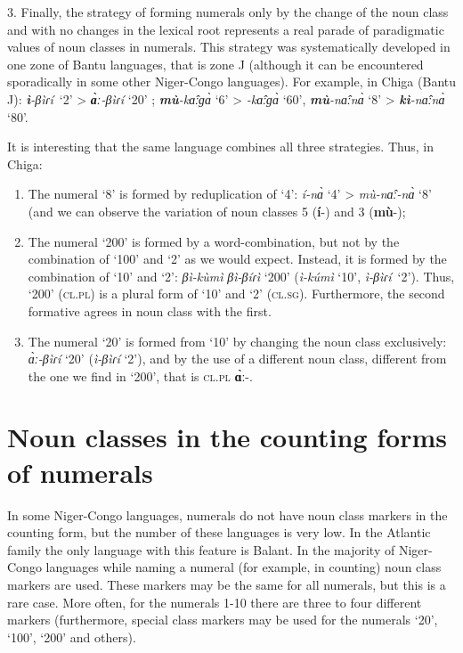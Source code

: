 3. Finally, the strategy of forming numerals only by the change of the noun class and with no changes in the lexical root represents a real parade of paradigmatic values of noun classes in numerals. This strategy was systematically developed in one zone of Bantu languages, that is zone J (although it can be encountered sporadically in some other Niger-Congo languages). For example, in Chiga (Bantu J): \textbf{\textit{ì}}\textit{-}\textit{βìɾ{\'{i}}}~‘2’ > \textbf{\textit{{\`{ɑ}}ː}}\textit{-}\textit{βìɾ{\'{i}}} ‘20’ ;  \textbf{\textit{m{\`{u}}}}\textit{-k{\^{ɑ}}ːɡ{\`{ɑ}}} ‘6’ >  \textbf{\textit{{}}}\textit{-k{\^{ɑ}}ːɡ{\`{ɑ}}} ‘60’, \textbf{\textit{m{\`{u}}}}\textit{-n{\^{ɑ}}ːn{\`{ɑ}}} ‘8’ > \textbf{\textit{kì}}\textit{-n{\^{ɑ}}ːn{\`{ɑ}}} ‘80’. 

It is interesting that the same language combines all three strategies. Thus, in Chiga: 

\begin{enumerate}
\item The numeral ‘8’ is formed by reduplication of ‘4’: \textit{{\'{i}}-n{\`{ɑ}}} ‘4’ > \textit{m{\`{u}}-n{\^{ɑ}}ː-n{\`{ɑ}}} ‘8’ (and we can observe the variation of noun classes 5 (\textbf{{\'{i}}}-) and 3 (\textbf{m{\`{u}}}-);
\item The numeral ‘200’ is formed by a word-combination, but not by the combination of ‘100’ and ‘2’ as we would expect. Instead, it is formed by the combination of ‘10’ and ‘2’: \textit{βì-k{\`{u}}mì} \textit{βì-}\textit{β{\'{i}}ɾì} ‘200’ (\textit{ì-k{\'{u}}mì} ‘10’, \textit{ì-β}\textit{ìɾ{\'{i}}}~‘2’). Thus, ‘200’ (\textsc{cl}.\textsc{pl}) is a plural form of ‘10’ and ‘2’ (\textsc{cl}.\textsc{sg}). Furthermore, the second formative agrees in noun class with the first. 
\item The numeral ‘20’ is formed from ‘10’ by changing the noun class exclusively: \textit{{\`{ɑ}}ː-β}\textit{ìɾ{\'{i}}} ‘20’ (\textit{ì-β}\textit{ìɾ{\'{i}}} ‘2’), and by the use of a different noun class, different from the one we find in ‘200’, that is \textsc{cl}.\textsc{pl} \textbf{{\`{ɑ}}ː}-.  
\end{enumerate}

\section{Noun classes in the counting forms of numerals} %

In some Niger-Congo languages, numerals do not have noun class markers in the counting form, but the number of these languages is very low. In the Atlantic family the only language with this feature is Balant. In the majority of Niger-Congo languages while naming a numeral (for example, in counting) noun class markers are used. These markers may be the same for all numerals, but this is a rare case. More often, for the numerals 1-10 there are three to four different markers (furthermore, special class markers may be used for the numerals ‘20’, ‘100’, ‘200’ and others). 

